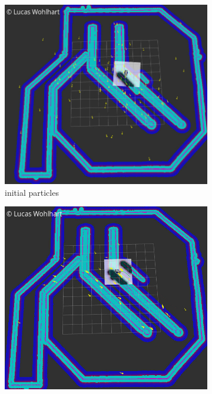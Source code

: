 \documentclass[10pt,journal,compsoc]{IEEEtran}
\begin{document}
\begin{figure}[ht]
      \centering
      \begin{subfigure}[b]{0.36\textwidth}
          \includegraphics[width=\textwidth]{img/particles_initial_high_cov}
          \caption{initial particles}
          \label{fig:particles_}
      \end{subfigure}
      \begin{subfigure}[b]{0.36\textwidth}
          \includegraphics[width=\textwidth]{img/particles_initial_high_cov_4sec}

\end{subfigure}
\end{figure}
\end{document}
